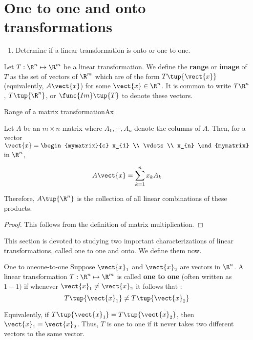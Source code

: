\section{One to one and onto transformations}

\begin{outcome}
  \begin{enumerate}
  \item Determine if a linear transformation is onto or one to one.
  \end{enumerate}
\end{outcome}

Let $T: \R^n \mapsto \R^m$ be a linear transformation. We define the \textbf{range} or \textbf{image} of $T$ as the set of vectors of $\R^{m}$ which are of the form
$T \tup{\vect{x}}$ (equivalently, $A\vect{x}$) for some $\vect{x}\in \R^{n}$. It is common
to write $T\R^{n}$, $T\tup{\R^{n}}$, or
$\func{Im}\tup{T} $ to denote these vectors.  

\begin{lemma}{Range of a matrix transformation}{Ax}

Let $A$ be an $m\times n$-matrix where $A_{1},\cdots , A_{n}$ denote the columns of
$A$. Then, for a vector $\vect{x}=\begin{mymatrix}{c}
x_{1} \\
\vdots \\
 x_{n}
\end{mymatrix}$ in $\R^n$,

\begin{equation*}
A\vect{x}=\sum_{k=1}^{n}x_{k}A_{k}
\end{equation*}

Therefore, $A \tup{\R^n }$ is the collection of all
linear combinations of these products.
\end{lemma}

\begin{proof}
This follows from the definition of matrix multiplication.
\end{proof}

This section is devoted to studying two important characterizations of linear transformations, called one to one and onto. We define them now. 

\begin{definition}{One to one}{one-to-one}
Suppose $\vect{x}_1$ and $\vect{x}_2$ are vectors in $\R^n$. A linear transformation $T: \R^n \mapsto \R^m$ is called \textbf{one to one} (often written as $1-1)$ if whenever
 $\vect{x}_1 \neq \vect{x}_2$ it follows that :
\begin{equation*}
T\tup{\vect{x}_1 } \neq T \tup{\vect{x}_2}
\end{equation*}

Equivalently, if $T\tup{\vect{x}_1 } =T\tup{\vect{x}_2}$,
then $\vect{x}_1 = \vect{x}_2$. Thus,  $T$ is one to one if it never takes two different
vectors to the same vector.
\end{definition}

